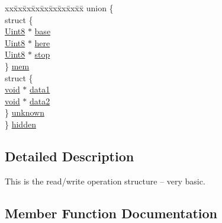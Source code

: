 \begin{DoxyCompactItemize}
\item 
\begin{tabbing}
xx\=xx\=xx\=xx\=xx\=xx\=xx\=xx\=xx\=\kill
union \{\\
\>struct \{\\
\>\>\hyperlink{_s_d_l__stdinc_8h_a2944638813a090aa23e62f4da842c3e2}{Uint8} $\ast$ \hyperlink{struct_s_d_l___r_wops_af9b489d7342296ce197b911cfa93b2ab}{base}\\
\>\>\hyperlink{_s_d_l__stdinc_8h_a2944638813a090aa23e62f4da842c3e2}{Uint8} $\ast$ \hyperlink{struct_s_d_l___r_wops_a6fc84601c17e347c6ef24c63a79deb57}{here}\\
\>\>\hyperlink{_s_d_l__stdinc_8h_a2944638813a090aa23e62f4da842c3e2}{Uint8} $\ast$ \hyperlink{struct_s_d_l___r_wops_a4108a41afa8b62e75b0f160de4b56103}{stop}\\
\>\} \hyperlink{struct_s_d_l___r_wops_a830ef39b29712325ee60d2c09190fdfe}{mem}\\
\>struct \{\\
\>\>\hyperlink{_s_d_l__opengles2__gl2ext_8h_ae5d8fa23ad07c48bb609509eae494c95}{void} $\ast$ \hyperlink{struct_s_d_l___r_wops_ab89d27b4312c0b9d664c81bc92917fc8}{data1}\\
\>\>\hyperlink{_s_d_l__opengles2__gl2ext_8h_ae5d8fa23ad07c48bb609509eae494c95}{void} $\ast$ \hyperlink{struct_s_d_l___r_wops_aca073130e2e262eb11e86e1be993e215}{data2}\\
\>\} \hyperlink{struct_s_d_l___r_wops_a5c2ef3288fcf78cc28f1b4b16b32eca1}{unknown}\\
\} \hyperlink{struct_s_d_l___r_wops_a2bf0dec0395f771b30c841fc7296164b}{hidden}\\

\end{tabbing}\end{DoxyCompactItemize}


\subsection{Detailed Description}
This is the read/write operation structure -- very basic. 

\subsection{Member Function Documentation}
